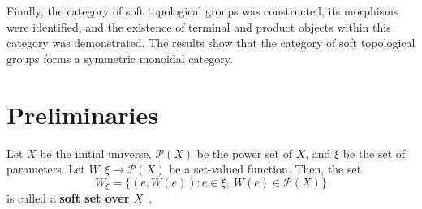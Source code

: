 \documentclass[preprint,12pt]{elsarticle}
\begin{document}
Finally, the category of soft topological groups was constructed, its morphisms were identified, and the existence of terminal and product objects within this category was demonstrated. The results show that the category of soft topological groups forms a symmetric monoidal category.


\section{Preliminaries}


\begin{defn}\label{}
\em{Let \( X \) be the initial universe, \( \mathcal{P}(X) \) be the power set of \( X \), and \( \xi \) be  the set of parameters.
Let \( W : \xi \to \mathcal{P}(X) \) be a set-valued function.
Then, the set
\[
 W_\xi = \{ (e, W(e)) : e \in \xi,\ W(e) \in \mathcal{P}(X) \}
\]
is called a \textbf{soft set over $X$}~\cite{Mol}.

}
\end{defn}
\end{document}
